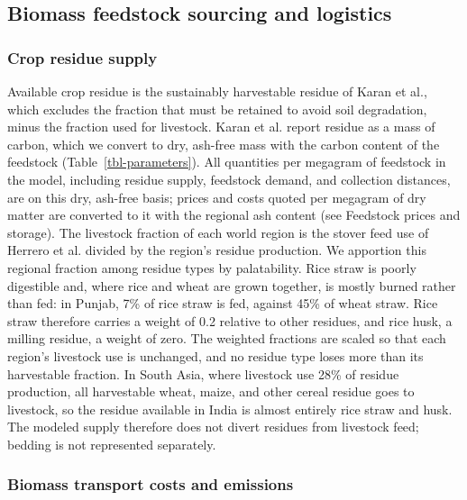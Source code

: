 \documentclass[
  letterpaper,
  twoside,
  twocolumn,
  9pt]{article}
\begin{document}
\subsection{Biomass feedstock sourcing and
logistics}\label{biomass-feedstock-sourcing-and-logistics}

\subsubsection{Crop residue supply}\label{crop-residue-supply}

Available crop residue is the sustainably harvestable residue of Karan
et al.\citep{karan2023}, which excludes the fraction that must be
retained to avoid soil degradation, minus the fraction used for
livestock. Karan et al.\citep{karan2023} report residue as a mass of
carbon, which we convert to dry, ash-free mass with the carbon content
of the feedstock (Table~\ref{tbl-parameters}). All quantities per
megagram of feedstock in the model, including residue supply, feedstock
demand, and collection distances, are on this dry, ash-free basis;
prices and costs quoted per megagram of dry matter are converted to it
with the regional ash content (see Feedstock prices and storage). The
livestock fraction of each world region is the stover feed use of
Herrero et al.\citep{herrero2013} divided by the region's residue
production. We apportion this regional fraction among residue types by
palatability. Rice straw is poorly digestible and, where rice and wheat
are grown together, is mostly burned rather than fed: in Punjab, 7\% of
rice straw is fed, against 45\% of wheat straw.\citep{kumar2015} Rice
straw therefore carries a weight of 0.2 relative to other residues, and
rice husk, a milling residue, a weight of zero. The weighted fractions
are scaled so that each region's livestock use is unchanged, and no
residue type loses more than its harvestable fraction. In South Asia,
where livestock use 28\% of residue production, all harvestable wheat,
maize, and other cereal residue goes to livestock, so the residue
available in India is almost entirely rice straw and husk. The modeled
supply therefore does not divert residues from livestock feed; bedding
is not represented separately.

\subsubsection{Biomass transport costs and
emissions}\label{biomass-transport-costs-and-emissions}
\end{document}
